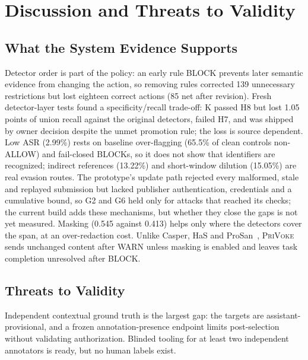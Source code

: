 \documentclass[sigconf]{acmart}
\theoremstyle{acmdefinition}\newtheorem{property}{Property}
\newcommand{\privoke}{\textsc{PriVoke}\xspace}
\newcommand{\pendingStageThirteen}[1]{#1}
\begin{document}
\section{Discussion and Threats to Validity}
\label{sec:discussion}
\subsection{What the System Evidence Supports}
Detector order is part of the policy: an early rule BLOCK prevents later semantic evidence from changing the action, so removing rules corrected 139 unnecessary restrictions but lost eighteen correct actions (85 net after revision). Fresh detector-layer tests found a specificity/recall trade-off: K passed H8 but lost 1.05 points of union recall against the original detectors, failed H7, and was shipped by owner decision despite the unmet promotion rule; the loss is source dependent. Low ASR (2.99\%) rests on baseline over-flagging (65.5\% of clean controls non-ALLOW) and fail-closed BLOCKs, so it does not show that identifiers are recognized; indirect references (13.22\%) and short-window dilution (15.05\%) are real evasion routes. The prototype's update path rejected every malformed, stale and replayed submission but lacked publisher authentication, credentials and a cumulative bound, so G2 and G6 held only for attacks that reached its checks; the current build adds these mechanisms, \pendingStageThirteen{but whether they close the gaps is not yet measured}. Masking (0.545 against 0.413) helps only where the detectors cover the span, at an over-redaction cost. Unlike Casper, HaS and ProSan~\cite{CasperPreprintV12024,HaS2024,ProSan2024}, \privoke sends unchanged content after WARN unless masking is enabled and leaves task completion unresolved after BLOCK.

\subsection{Threats to Validity}
\label{sec:limitations}
Independent contextual ground truth is the largest gap: the targets are assistant-provisional, and a frozen annotation-presence endpoint limits post-selection without validating authorization. Blinded tooling for at least two independent annotators is ready, but no human labels exist.
\end{document}
